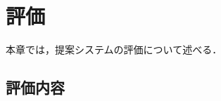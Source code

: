\chapter{評価}
\label{evaluation}
本章では，提案システムの評価について述べる．

\section{評価内容}
\label{evaluation:contents}


